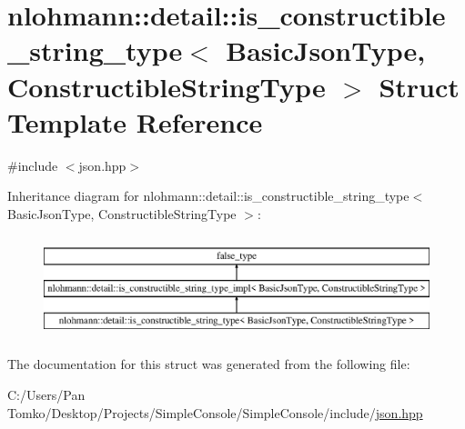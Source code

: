 \hypertarget{structnlohmann_1_1detail_1_1is__constructible__string__type}{}\section{nlohmann\+::detail\+::is\+\_\+constructible\+\_\+string\+\_\+type$<$ Basic\+Json\+Type, Constructible\+String\+Type $>$ Struct Template Reference}
\label{structnlohmann_1_1detail_1_1is__constructible__string__type}


{\ttfamily \#include $<$json.\+hpp$>$}

Inheritance diagram for nlohmann\+::detail\+::is\+\_\+constructible\+\_\+string\+\_\+type$<$ Basic\+Json\+Type, Constructible\+String\+Type $>$\+:\begin{figure}[H]
\begin{center}
\leavevmode
\includegraphics[height=3.000000cm]{d3/d84/structnlohmann_1_1detail_1_1is__constructible__string__type}
\end{center}
\end{figure}


The documentation for this struct was generated from the following file\+:\begin{DoxyCompactItemize}
\item 
C\+:/\+Users/\+Pan Tomko/\+Desktop/\+Projects/\+Simple\+Console/\+Simple\+Console/include/\mbox{\hyperlink{json_8hpp}{json.\+hpp}}\end{DoxyCompactItemize}
